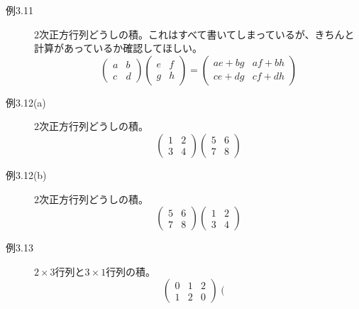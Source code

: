 \documentclass[10pt]{jsreport}
\theoremstyle{definition}%
\numberwithin{equation}{section}%
\begin{document}
\begin{description}
  \item[例3.11] $2$次正方行列どうしの積。これはすべて書いてしまっているが、きちんと計算があっているか確認してほしい。\begin{equation}
    \left( 
     \begin{matrix}
         a & b \\
         c & d
     \end{matrix}
   \right)\left( 
    \begin{matrix}
        e & f \\
        g & h
    \end{matrix}
  \right)=\left( 
    \begin{matrix}
        ae+bg & af+bh \\
        ce+dg & cf+dh
    \end{matrix}
  \right)
  \end{equation}
  \item[例3.12(a)] $2$次正方行列どうしの積。
  \begin{equation}
    \left( 
     \begin{matrix}
         1 & 2 \\
         3 & 4
     \end{matrix}
   \right)\left( 
    \begin{matrix}
        5 & 6 \\
        7 & 8
    \end{matrix}
  \right)
  \end{equation}
  \item[例3.12(b)] $2$次正方行列どうしの積。
  \begin{equation}
    \left( 
    \begin{matrix}
        5 & 6 \\
        7 & 8
    \end{matrix}
  \right)\left( 
    \begin{matrix}
        1 & 2 \\
        3 & 4
    \end{matrix}
  \right)
  \end{equation}
  \item[例3.13] $2\times 3$行列と$3\times 1$行列の積。
  \begin{equation}
    \left( 
     \begin{matrix}
         0 & 1 & 2\\
         1 & 2 & 0
     \end{matrix}
   \right)\left( 
    \begin{matrix}

\end{matrix}
\end{equation}
\end{description}
\end{document}

